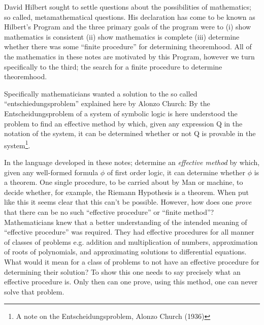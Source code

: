 \documentclass{book}
\begin{document}


    David Hilbert sought to settle questions about the possibilities of mathematics; so called, metamathematical questions. His declaration has come to be known as Hilbert's Program and the three primary goals of the program were to (i) show mathematics is consistent (ii) show mathematics is complete (iii) determine whether there was some ``finite procedure'' for determining theoremhood. All of the mathematics in these notes are motivated by this Program, however we turn specifically to the third; the search for a finite procedure to determine theoremhood. 

    Specifically mathematicians wanted a solution to the so called ``entschiedungsproblem'' explained here by Alonzo Church: By the Entscheidungsproblem of a system of symbolic logic is here understood the problem to find an effective method by which, given any expression Q in the notation of the system, it can be determined whether or not Q is provable in the system\footnote{A note on the Entscheidungsproblem, Alonzo Church (1936)}. 
    
    In the language developed in these notes; determine an \emph{effective method} by which, given any well-formed formula $\phi$ of first order logic, it can determine whether $\phi$ is a theorem. One single procedure, to be carried about by Man or machine, to decide whether, for example, the Riemann Hypothesis is a theorem. When put like this it seems clear that this can't be possible. However, how does one \emph{prove} that there can be no such ``effective procedure'' or ``finite method''? Mathematicians knew  that a better understanding of the intended meaning of ``effective procedure'' was required. They had effective procedures for all manner of classes of problems e.g. addition and multiplication of numbers, approximation of roots of polynomials, and approximating solutions to differential equations. What would it mean for a class of problems to not have an effective procedure for determining their solution? To show this one needs to say precisely what an effective procedure is. Only then can one prove, using this method, one can never solve that problem. 

\end{document}
